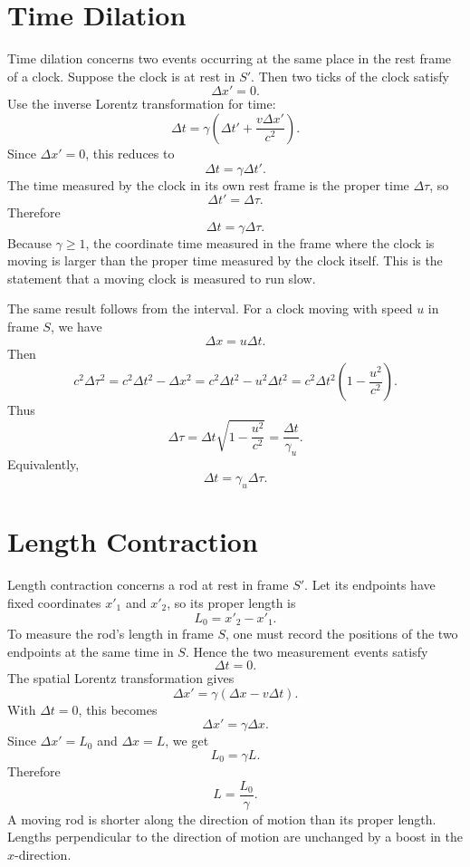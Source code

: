 \begin{center}
\end{center}

\clearpage

\section{Time Dilation}

Time dilation concerns two events occurring at the same place in the rest frame
of a clock.  Suppose the clock is at rest in \(S'\).  Then two ticks of the
clock satisfy
\[
\Delta x'=0.
\]
Use the inverse Lorentz transformation for time:
\[
\Delta t=\gamma\left(\Delta t'+\frac{v\Delta x'}{c^2}\right).
\]
Since \(\Delta x'=0\), this reduces to
\[
\Delta t=\gamma\Delta t'.
\]
The time measured by the clock in its own rest frame is the proper time
\(\Delta\tau\), so
\[
\Delta t'=\Delta\tau.
\]
Therefore
\[
\boxed{\Delta t=\gamma\Delta\tau.}
\]
Because \(\gamma\geq1\), the coordinate time measured in the frame where the
clock is moving is larger than the proper time measured by the clock itself.
This is the statement that a moving clock is measured to run slow.

The same result follows from the interval.  For a clock moving with speed \(u\)
in frame \(S\), we have
\[
\Delta x=u\Delta t.
\]
Then
\[
c^2\Delta\tau^2=c^2\Delta t^2-\Delta x^2
=c^2\Delta t^2-u^2\Delta t^2
=c^2\Delta t^2\left(1-\frac{u^2}{c^2}\right).
\]
Thus
\[
\Delta\tau=\Delta t\sqrt{1-\frac{u^2}{c^2}}
=\frac{\Delta t}{\gamma_u}.
\]
Equivalently,
\[
\Delta t=\gamma_u\Delta\tau.
\]

\begin{center}
\end{center}

\clearpage

\section{Length Contraction}

Length contraction concerns a rod at rest in frame \(S'\).  Let its endpoints
have fixed coordinates \(x'_1\) and \(x'_2\), so its proper length is
\[
L_0=x'_2-x'_1.
\]
To measure the rod's length in frame \(S\), one must record the positions of the
two endpoints at the same time in \(S\).  Hence the two measurement events
satisfy
\[
\Delta t=0.
\]
The spatial Lorentz transformation gives
\[
\Delta x'=\gamma(\Delta x-v\Delta t).
\]
With \(\Delta t=0\), this becomes
\[
\Delta x'=\gamma\Delta x.
\]
Since \(\Delta x'=L_0\) and \(\Delta x=L\), we get
\[
L_0=\gamma L.
\]
Therefore
\[
\boxed{L=\frac{L_0}{\gamma}.}
\]
A moving rod is shorter along the direction of motion than its proper length.
Lengths perpendicular to the direction of motion are unchanged by a boost in the
\(x\)-direction.

